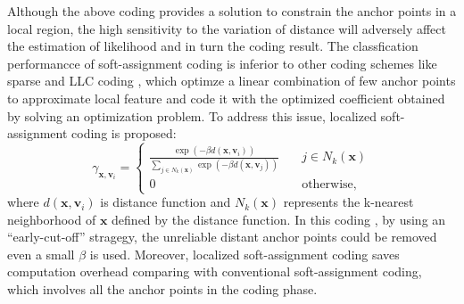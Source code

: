 \documentclass{llncs}
\def \x {\mathbf{x}}
\def \v {\mathbf{v}}
\begin{document}
	Although the above coding  provides a solution to constrain the anchor points in a local region, the high sensitivity to the variation of distance will adversely affect the estimation of likelihood and in turn the coding result. The classfication performancce of soft-assignment coding is inferior to other coding schemes like sparse and LLC coding \cite{18} \cite{19} \cite{20} \cite{21}, which optimze a linear combination of few anchor points to approximate local feature and code it with the optimized coefficient obtained by solving an optimization problem. To address this issue, localized soft-assignment coding  \cite{8} is proposed: 
	\begin{equation}
	\gamma_{\x,\v_i} = \left\{ \begin{array}{lcl}
	\frac{\exp(-\beta d(\x, \v_i))}{\sum_{j \in N_k(\x)}\exp(-\beta d(\x,\v_j))} \quad &j\in N_k(\x) \\
	0 \quad &\mbox{otherwise},
	\end{array}
	\right.
	\end{equation}
	where $d(\x,\v_i)$ is distance function and $N_k(\x)$ represents the k-nearest neighborhood of $\x$ defined by the distance function. In this coding , by using an ``early-cut-off'' stragegy, the unreliable distant anchor points could be removed even a small $\beta$ is used. Moreover, localized soft-assignment coding saves computation overhead comparing with conventional soft-assignment coding, which involves all the anchor points in the coding phase.
\end{document}
